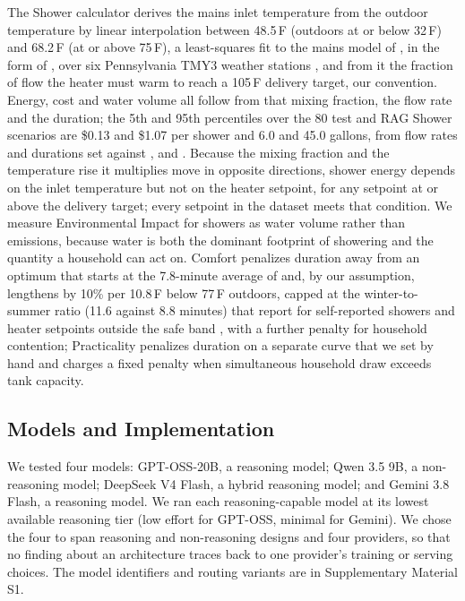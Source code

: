 \documentclass[final,3p,times]{elsarticle}
\begin{document}
The Shower calculator derives the mains inlet temperature from the outdoor temperature by linear interpolation between 48.5\,\textdegree{}F (outdoors at or below 32\,\textdegree{}F) and 68.2\,\textdegree{}F (at or above 75\,\textdegree{}F), a least-squares fit to the mains model of \citet{burch2007}, in the form of \citet{hendron2010hsp}, over six Pennsylvania TMY3 weather stations \cite{onebuilding_tmy3}, and from it the fraction of flow the heater must warm to reach a 105\,\textdegree{}F delivery target, our convention. Energy, cost and water volume all follow from that mixing fraction, the flow rate and the duration; the 5th and 95th percentiles over the 80 test and RAG Shower scenarios are \$0.13 and \$1.07 per shower and 6.0 and 45.0 gallons, from flow rates and durations set against \citet{epawatersense}, \citet{reu2016} and \citet{harrispoll2024}. Because the mixing fraction and the temperature rise it multiplies move in opposite directions, shower energy depends on the inlet temperature but not on the heater setpoint, for any setpoint at or above the delivery target; every setpoint in the dataset meets that condition. We measure Environmental Impact for showers as water volume rather than emissions, because water is both the dominant footprint of showering and the quantity a household can act on. Comfort penalizes duration away from an optimum that starts at the 7.8-minute average of \citet{reu2016} and, by our assumption, lengthens by 10\% per 10.8\,\textdegree{}F below 77\,\textdegree{}F outdoors, capped at the winter-to-summer ratio (11.6 against 8.8 minutes) that \citet{ibanezrueda2023} report for self-reported showers and heater setpoints outside the safe band \cite{cdc2026}, with a further penalty for household contention; Practicality penalizes duration on a separate curve that we set by hand and charges a fixed penalty when simultaneous household draw exceeds tank capacity.

\FloatBarrier
\subsection{Models and Implementation}
\label{sec:models-implementation}

We tested four models: GPT-OSS-20B, a reasoning model; Qwen 3.5 9B, a non-reasoning model; DeepSeek V4 Flash, a hybrid reasoning model; and Gemini 3.8 Flash, a reasoning model. We ran each reasoning-capable model at its lowest available reasoning tier (low effort for GPT-OSS, minimal for Gemini). We chose the four to span reasoning and non-reasoning designs and four providers, so that no finding about an architecture traces back to one provider's training or serving choices. The model identifiers and routing variants are in Supplementary Material S1.
\end{document}
